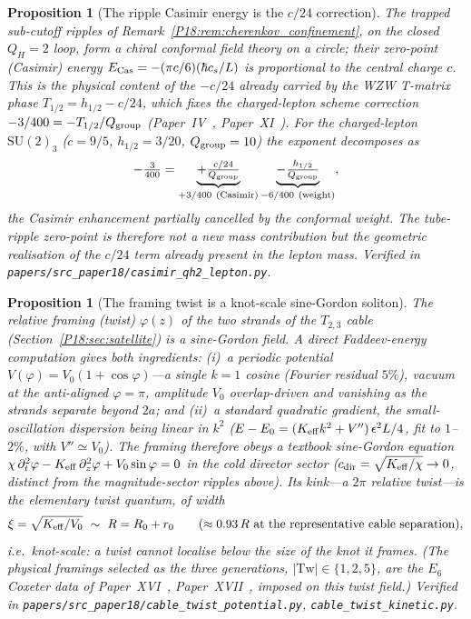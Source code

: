 \documentclass[11pt,a4paper]{article}
\newtheorem{proposition}[theorem]{Proposition}
\theoremstyle{definition}\newtheorem{definition}[theorem]{Definition}
\theoremstyle{remark}
\newcommand{\SU}{\mathrm{SU}}
\newcommand{\QH}{Q_H}
\begin{document}
\begin{proposition}[The ripple Casimir energy is the $c/24$ correction]
\label{P18:prop:ripple_casimir}
The trapped sub-cutoff ripples of Remark~\ref{P18:rem:cherenkov_confinement},
on the closed $\QH=2$ loop, form a chiral conformal field theory on a circle;
their zero-point (Casimir) energy $E_{\rm Cas}=-(\pi c/6)(\hbar c_s/L)$ is
proportional to the central charge $c$. This is the physical content of the
$-c/24$ already carried by the WZW T-matrix phase $T_{1/2}=h_{1/2}-c/24$, which
fixes the charged-lepton scheme correction $-3/400=-T_{1/2}/Q_{\rm group}$
(Paper~IV~\cite{Paper4}, Paper~XI~\cite{Paper11}). For the charged-lepton
$\SU(2)_3$ ($c=9/5$, $h_{1/2}=3/20$, $Q_{\rm group}=10$) the exponent decomposes
as
\begin{equation}
  -\tfrac{3}{400}
  =\underbrace{+\tfrac{c/24}{Q_{\rm group}}}_{+3/400\ (\text{Casimir})}
   \underbrace{-\tfrac{h_{1/2}}{Q_{\rm group}}}_{-6/400\ (\text{weight})},
  \label{P18:eq:casimir_decomp}
\end{equation}
the Casimir enhancement partially cancelled by the conformal weight. The
tube-ripple zero-point is therefore not a new mass contribution but the
geometric realisation of the $c/24$ term already present in the lepton mass.
Verified in \texttt{papers/src\_paper18/casimir\_qh2\_lepton.py}.
\end{proposition}

\begin{proposition}[The framing twist is a knot-scale sine-Gordon soliton]
\label{P18:prop:twist_sinegordon}
The relative framing (twist) $\varphi(z)$ of the two strands of the $T_{2,3}$
cable (Section~\ref{P18:sec:satellite}) is a sine-Gordon field. A direct
Faddeev-energy computation gives both ingredients: (i)~a periodic potential
$V(\varphi)=V_0(1+\cos\varphi)$---a single $k=1$ cosine (Fourier residual
$5\%$), vacuum at the anti-aligned $\varphi=\pi$, amplitude $V_0$ overlap-driven
and vanishing as the strands separate beyond $2a$; and (ii)~a \emph{standard
quadratic} gradient, the small-oscillation dispersion being linear in $k^2$
($E-E_0=(K_{\rm eff}k^2+V'')\,\epsilon^2 L/4$, fit to $1$--$2\%$, with
$V''\simeq V_0$). The framing therefore obeys a textbook sine-Gordon equation
$\chi\,\partial_t^2\varphi-K_{\rm eff}\,\partial_z^2\varphi+V_0\sin\varphi=0$ in
the cold director sector ($c_{\rm dir}=\sqrt{K_{\rm eff}/\chi}\to0$, distinct
from the magnitude-sector ripples above). Its kink---a $2\pi$ relative twist---is
the elementary twist quantum, of width
\begin{equation}
  \xi=\sqrt{K_{\rm eff}/V_0}\ \sim\ R=R_0+r_0
  \qquad(\text{$\approx0.93\,R$ at the representative cable separation}),
  \label{P18:eq:twist_soliton}
\end{equation}
i.e.\ \emph{knot-scale}: a twist cannot localise below the size of the knot it
frames. (The physical framings selected as the three generations,
$|\mathrm{Tw}|\in\{1,2,5\}$, are the $E_6$ Coxeter data of
Paper~XVI~\cite{Paper16}, Paper~XVII~\cite{Paper17}, imposed on this twist
field.) Verified in
\texttt{papers/src\_paper18/cable\_twist\_potential.py},
\texttt{cable\_twist\_kinetic.py}.
\end{proposition}
\end{document}
